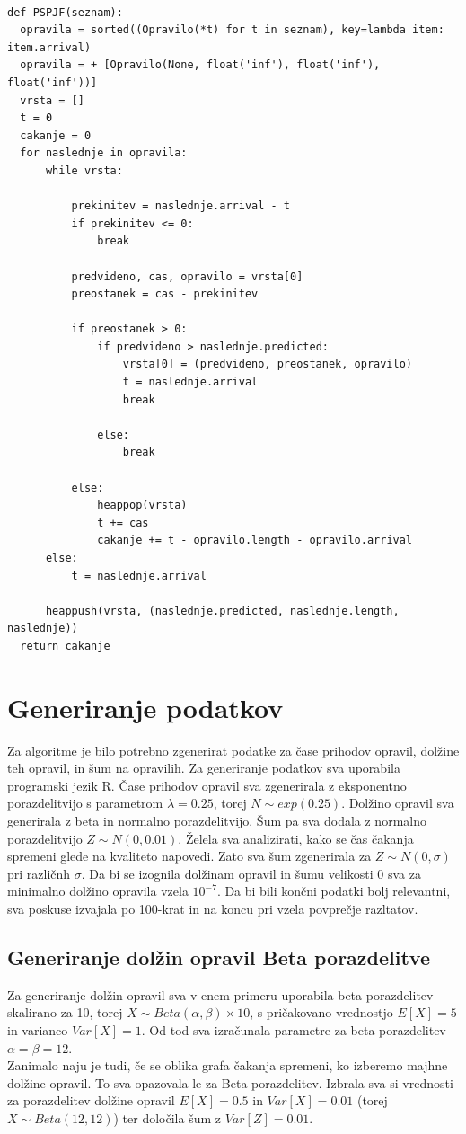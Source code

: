 \documentclass[a4paper, pt14]{article}
\begin{document}
\begin{verbatim}

def PSPJF(seznam):
  opravila = sorted((Opravilo(*t) for t in seznam), key=lambda item: item.arrival)
  opravila = + [Opravilo(None, float('inf'), float('inf'), float('inf'))] 
  vrsta = []
  t = 0
  cakanje = 0
  for naslednje in opravila:
      while vrsta: 

          prekinitev = naslednje.arrival - t 
          if prekinitev <= 0:
              break 

          predvideno, cas, opravilo = vrsta[0]
          preostanek = cas - prekinitev

          if preostanek > 0:
              if predvideno > naslednje.predicted:
                  vrsta[0] = (predvideno, preostanek, opravilo) 
                  t = naslednje.arrival
                  break 

              else:  
                  break

          else:
              heappop(vrsta)
              t += cas
              cakanje += t - opravilo.length - opravilo.arrival
      else:
          t = naslednje.arrival 
      
      heappush(vrsta, (naslednje.predicted, naslednje.length, naslednje)) 
  return cakanje 
\end{verbatim}

\section{Generiranje podatkov}
Za algoritme je bilo potrebno zgenerirat podatke za čase prihodov opravil, dolžine teh opravil, in šum na opravilih. 
Za generiranje podatkov sva uporabila programski jezik R. Čase prihodov opravil sva zgenerirala z eksponentno porazdelitvijo s parametrom $\lambda = 0.25$, torej $N \sim exp(0.25) $. 
Dolžino opravil sva generirala z beta in normalno porazdelitvijo.
Šum pa sva dodala z normalno porazdelitvijo $ Z \sim N(0, 0.01) $. 
Želela sva analizirati, kako se čas čakanja spremeni glede na kvaliteto napovedi. Zato sva šum zgenerirala za $ Z \sim N(0, \sigma) $ pri različnh $\sigma$.
Da bi se izognila dolžinam opravil in šumu velikosti 0 sva za minimalno dolžino opravila vzela $10^{-7}$. Da bi bili končni podatki bolj relevantni, sva poskuse izvajala po 100-krat in na koncu pri vzela povprečje razltatov.

\subsection{Generiranje dolžin opravil Beta porazdelitve}
Za generiranje dolžin opravil sva v enem primeru uporabila beta porazdelitev skalirano za 10, torej $X \sim Beta(\alpha, \beta) \times 10 $, s pričakovano vrednostjo $ E[X] = 5$ in varianco $Var[X] = 1 $. Od tod sva izračunala parametre za beta porazdelitev $\alpha = \beta = 12$.\\
Zanimalo naju je tudi, če se oblika grafa čakanja spremeni, ko izberemo majhne dolžine opravil. To sva opazovala le za Beta porazdelitev. Izbrala sva si vrednosti za porazdelitev dolžine opravil $E[X] = 0.5$ in $Var[X] = 0.01 $ (torej $X \sim Beta(12,12)$) ter določila šum z $Var[Z] = 0.01 $.
\end{document}
